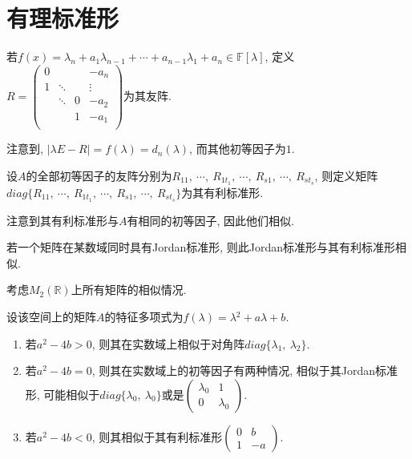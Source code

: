 \section{ 有理标准形 }

\begin{definition}[友阵]
    若$f(x)=\lambda{_n}+a_1\lambda{_{n-1}}+\cdots+a_{n-1}\lambda{_1}+a_n \in \mathbb{F}[\lambda]$, 
    定义$R=\begin{pmatrix}
        0 &        & & -a_n \\
        1 & \ddots & & \vdots \\
          & \ddots &0& -a_2 \\
          &        &1& -a_1 \\
    \end{pmatrix}$为其友阵.\par
    注意到, $\vert \lambda E-R \vert = f(\lambda) = d_n(\lambda)$, 而其他初等因子为$1$.
\end{definition}

\begin{definition}[有理标准形]
    设$A$的全部初等因子的友阵分别为$R_{11},\ \cdots,\ R_{1t_1},\ \cdots,\ R_{s1},\ \cdots,\ R_{st_s}$, 
    则定义矩阵$diag\{R_{11},\ \cdots,\ R_{1t_1},\ \cdots,\ R_{s1},\ \cdots,\ R_{st_s}\}$为其有利标准形.\par
    注意到其有利标准形与$A$有相同的初等因子, 因此他们相似.
\end{definition}

\begin{example}
    若一个矩阵在某数域同时具有Jordan标准形, 则此Jordan标准形与其有利标准形相似.
\end{example}

\begin{example}
    考虑$M_2(\mathbb{R})$上所有矩阵的相似情况.\par
    设该空间上的矩阵$A$的特征多项式为$f(\lambda)=\lambda{^2}+a\lambda+b$.
    \begin{enumerate}[itemindent=1em]
        \item 若$a^2-4b>0$, 则其在实数域上相似于对角阵$diag\{\lambda{_1},\ \lambda{_2}\}$.
        \item 若$a^2-4b=0$, 则其在实数域上的初等因子有两种情况, 相似于其Jordan标准形, 
        可能相似于$diag\{\lambda{_0},\ \lambda{_0}\}$或是$\begin{pmatrix}
            \lambda{_0} & 1\\
            0           & \lambda{_0}
        \end{pmatrix}$.
        \item 若$a^2-4b<0$, 则其相似于其有利标准形$\begin{pmatrix}
            0 & b\\
            1 & -a
        \end{pmatrix}$.
    \end{enumerate}
\end{example}

